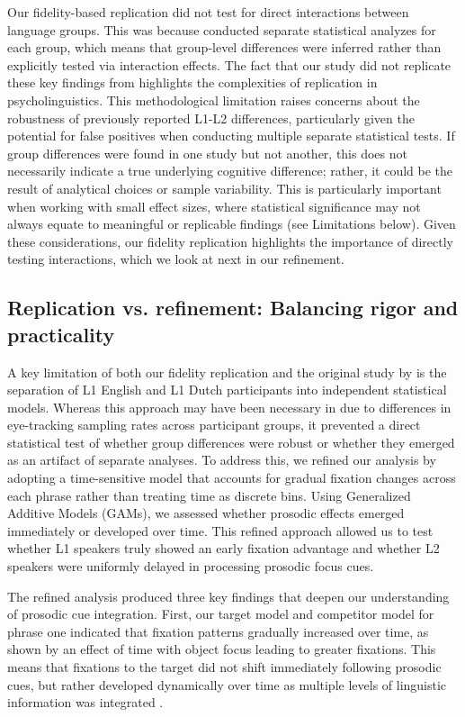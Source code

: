 Our fidelity-based replication did not test for direct interactions between language groups. This was because \textcite{ge2021a} conducted separate statistical analyzes for each group, which means that group-level differences were inferred rather than explicitly tested via interaction effects. The fact that our study did not replicate these key findings from \textcite{ge2021a} highlights the complexities of replication in psycholinguistics. This methodological limitation raises concerns about the robustness of previously reported L1-L2 differences, particularly given the potential for false positives when conducting multiple separate statistical tests. If group differences were found in one study but not another, this does not necessarily indicate a true underlying cognitive difference; rather, it could be the result of analytical choices or sample variability. This is particularly important when working with small effect sizes, where statistical significance may not always equate to meaningful or replicable findings (see Limitations below). Given these considerations, our fidelity replication highlights the importance of directly testing interactions, which we look at next in our refinement.


\subsection{Replication vs. refinement: Balancing rigor and practicality}

A key limitation of both our fidelity replication and the original study by \textcite{ge2021a} is the separation of L1 English and L1 Dutch participants into independent statistical models. Whereas this approach may have been necessary in \textcite{ge2021a} due to differences in eye-tracking sampling rates across participant groups, it prevented a direct statistical test of whether group differences were robust or whether they emerged as an artifact of separate analyses. To address this, we refined our analysis by adopting a time-sensitive model that accounts for gradual fixation changes across each phrase rather than treating time as discrete bins. Using Generalized Additive Models (GAMs), we assessed whether prosodic effects emerged immediately or developed over time. This refined approach allowed us to test whether L1 speakers truly showed an early fixation advantage and whether L2 speakers were uniformly delayed in processing prosodic focus cues.

The refined analysis produced three key findings that deepen our understanding of prosodic cue integration. First, our target model and competitor model for phrase one indicated that fixation patterns gradually increased over time, as shown by an effect of time with object focus leading to greater fixations. This means that fixations to the target did not shift immediately following prosodic cues, but rather developed dynamically over time as multiple levels of linguistic information was integrated \parencite[see][]{Lambrecht1994}.

